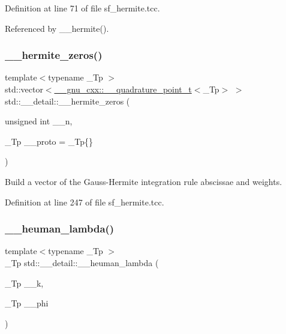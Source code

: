 Definition at line 71 of file sf\+\_\+hermite.\+tcc.



Referenced by \+\_\+\+\_\+hermite().

\mbox{\label{namespacestd_1_1____detail_a34e064cf8ddf0680ce559ba3f976c6dd}} 
\subsubsection{\texorpdfstring{\+\_\+\+\_\+hermite\+\_\+zeros()}{\_\_hermite\_zeros()}}
{\footnotesize\ttfamily template$<$typename \+\_\+\+Tp $>$ \\
std\+::vector$<$\hyperlink{struct____gnu__cxx_1_1____quadrature__point__t}{\+\_\+\+\_\+gnu\+\_\+cxx\+::\+\_\+\+\_\+quadrature\+\_\+point\+\_\+t}$<$\+\_\+\+Tp$>$ $>$ std\+::\+\_\+\+\_\+detail\+::\+\_\+\+\_\+hermite\+\_\+zeros (\begin{DoxyParamCaption}\item[{unsigned int}]{\+\_\+\+\_\+n,  }\item[{\+\_\+\+Tp}]{\+\_\+\+\_\+proto = {\ttfamily \+\_\+Tp\{\}} }\end{DoxyParamCaption})}

Build a vector of the Gauss-\/\+Hermite integration rule abscissae and weights. 

Definition at line 247 of file sf\+\_\+hermite.\+tcc.

\mbox{\label{namespacestd_1_1____detail_a90938823a16cabc06031ebf209066a94}} 
\subsubsection{\texorpdfstring{\+\_\+\+\_\+heuman\+\_\+lambda()}{\_\_heuman\_lambda()}}
{\footnotesize\ttfamily template$<$typename \+\_\+\+Tp $>$ \\
\+\_\+\+Tp std\+::\+\_\+\+\_\+detail\+::\+\_\+\+\_\+heuman\+\_\+lambda (\begin{DoxyParamCaption}\item[{\+\_\+\+Tp}]{\+\_\+\+\_\+k,  }\item[{\+\_\+\+Tp}]{\+\_\+\+\_\+phi }\end{DoxyParamCaption})}

